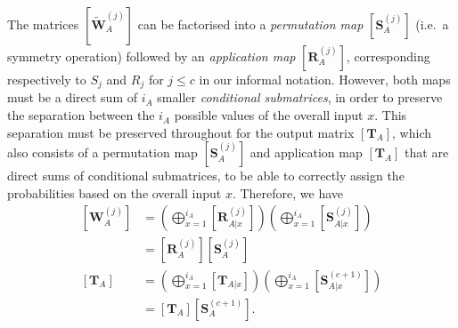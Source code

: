 \documentclass[10pt, a4paper]{article}
\numberwithin{equation}{section} %
\theoremstyle{definition}
\theoremstyle{plain}
\newcommand{\?}{\mathrel{?}} %
\newcommand{\matr}[2][]{\left[\mathbf{#2}#1\right]} %
\begin{document}
              The matrices \(\matr[_A^{(j)}]{\tilde{W}}\) can be factorised into a \emph{permutation map} \(\matr[_A^{(j)}]{S}\) (i.e.\ a symmetry operation) followed by an \emph{application map} \(\matr[_A^{(j)}]{R}\), corresponding respectively to \(S_j\) and \(R_j\) for \(j \leq c\) in our informal notation. However, both maps must be a direct sum of \(i_A\) smaller \emph{conditional submatrices}, in order to preserve the separation between the \(i_A\) possible values of the overall input \(x\). This separation must be preserved throughout for the output matrix \(\matr[_A]{T}\), which also consists of a permutation map \(\matr[_A^{(j)}]{S}\) and application map \(\matr[_A]{T}\) that are direct sums of conditional submatrices, to be able to correctly assign the probabilities based on the overall input \(x\). Therefore, we have
              \begin{align}
                \matr[_A^{(j)}]{W} &= \left( \bigoplus_{x=1}^{i_A} \matr[_{A|x}^{(j)}]{R} \right) \left( \bigoplus_{x=1}^{i_A} \matr[_{A|x}^{(j)}]{S} \right) \\
                                   &= \matr[_{A}^{(j)}]{R} \matr[_{A}^{(j)}]{S} \\
                \matr[_A]{T} &= \left( \bigoplus_{x=1}^{i_A} \matr[_{A|x}]{T} \right) \left( \bigoplus_{x=1}^{i_A} \matr[_{A|x}^{(c+1)}]{S} \right) \\
                                   &= \matr[_{A}]{T} \matr[_{A}^{(c+1)}]{S}.
              \end{align}
\end{document}
